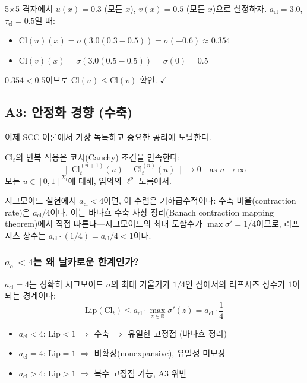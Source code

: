 \begin{example}
5$\times$5 격자에서 $u(x) = 0.3$ (모든 $x$), $v(x) = 0.5$ (모든 $x$)으로 설정하자. $a_{\mathrm{cl}} = 3.0$, $\tau_{\mathrm{cl}} = 0.5$일 때:
\begin{itemize}
    \item $\mathrm{Cl}(u)(x) = \sigma(3.0(0.3 - 0.5)) = \sigma(-0.6) \approx 0.354$
    \item $\mathrm{Cl}(v)(x) = \sigma(3.0(0.5 - 0.5)) = \sigma(0) = 0.5$
\end{itemize}
$0.354 < 0.5$이므로 $\mathrm{Cl}(u) \leq \mathrm{Cl}(v)$ 확인. $\checkmark$
\end{example}


\subsection{A3: 안정화 경향 (수축)}

이제 SCC 이론에서 가장 독특하고 중요한 공리에 도달한다.

\begin{axiom}[A3: 안정화 경향]
\label{ax:A3}
$\mathrm{Cl}_t$의 반복 적용은 코시(Cauchy) 조건을 만족한다:
\begin{equation}
    \|\mathrm{Cl}_t^{(n+1)}(u) - \mathrm{Cl}_t^{(n)}(u)\| \to 0 \quad \text{as } n \to \infty
\end{equation}
모든 $u \in [0,1]^{X_t}$에 대해, 임의의 $\ell^p$ 노름에서.
\end{axiom}

시그모이드 실현에서 $a_{\mathrm{cl}} < 4$이면, 이 수렴은 기하급수적이다: 수축 비율(contraction rate)은 $a_{\mathrm{cl}}/4$이다. 이는 바나흐 수축 사상 정리(Banach contraction mapping theorem)에서 직접 따른다---시그모이드의 최대 도함수가 $\max \sigma' = 1/4$이므로, 리프시츠 상수는 $a_{\mathrm{cl}} \cdot (1/4) = a_{\mathrm{cl}}/4 < 1$이다.

\subsubsection{$a_{\mathrm{cl}} < 4$는 왜 날카로운 한계인가?}

$a_{\mathrm{cl}} = 4$는 정확히 시그모이드 $\sigma$의 최대 기울기가 $1/4$인 점에서의 리프시츠 상수가 $1$이 되는 경계이다:
\begin{equation}
    \text{Lip}(\mathrm{Cl}_t) \leq a_{\mathrm{cl}} \cdot \max_{z \in \mathbb{R}} \sigma'(z) = a_{\mathrm{cl}} \cdot \frac{1}{4}
\end{equation}
\begin{itemize}
    \item $a_{\mathrm{cl}} < 4$: $\text{Lip} < 1$ $\Rightarrow$ 수축 $\Rightarrow$ 유일한 고정점 (바나흐 정리)
    \item $a_{\mathrm{cl}} = 4$: $\text{Lip} = 1$ $\Rightarrow$ 비확장(nonexpansive), 유일성 미보장
    \item $a_{\mathrm{cl}} > 4$: $\text{Lip} > 1$ $\Rightarrow$ 복수 고정점 가능, A3 위반
\end{itemize}

